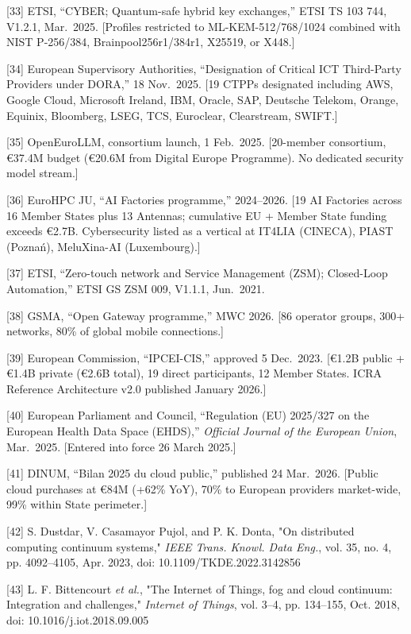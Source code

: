 \documentclass{ieeeaccess}
\begin{document}
{[}33{]} ETSI, ``CYBER; Quantum-safe hybrid key exchanges,'' ETSI TS 103
744, V1.2.1, Mar.~2025. {[}Profiles restricted to ML-KEM-512/768/1024
combined with NIST P-256/384, Brainpool256r1/384r1, X25519, or X448.{]}

{[}34{]} European Supervisory Authorities, ``Designation of Critical ICT
Third-Party Providers under DORA,'' 18 Nov.~2025. {[}19 CTPPs designated
including AWS, Google Cloud, Microsoft Ireland, IBM, Oracle, SAP,
Deutsche Telekom, Orange, Equinix, Bloomberg, LSEG, TCS, Euroclear,
Clearstream, SWIFT.{]}

{[}35{]} OpenEuroLLM, consortium launch, 1 Feb.~2025. {[}20-member
consortium, €37.4M budget (€20.6M from Digital Europe Programme). No
dedicated security model stream.{]}

{[}36{]} EuroHPC JU, ``AI Factories programme,'' 2024--2026. {[}19 AI
Factories across 16 Member States plus 13 Antennas; cumulative EU +
Member State funding exceeds €2.7B. Cybersecurity listed as a vertical
at IT4LIA (CINECA), PIAST (Poznań), MeluXina-AI (Luxembourg).{]}

{[}37{]} ETSI, ``Zero-touch network and Service Management (ZSM);
Closed-Loop Automation,'' ETSI GS ZSM 009, V1.1.1, Jun.~2021.

{[}38{]} GSMA, ``Open Gateway programme,'' MWC 2026. {[}86 operator
groups, 300+ networks, 80\% of global mobile connections.{]}

{[}39{]} European Commission, ``IPCEI-CIS,'' approved 5 Dec.~2023.
{[}€1.2B public + €1.4B private (€2.6B total), 19 direct participants,
12 Member States. ICRA Reference Architecture v2.0 published January
2026.{]}

{[}40{]} European Parliament and Council, ``Regulation (EU) 2025/327 on
the European Health Data Space (EHDS),'' \emph{Official Journal of the
European Union}, Mar.~2025. {[}Entered into force 26 March 2025.{]}

{[}41{]} DINUM, ``Bilan 2025 du cloud public,'' published 24 Mar.~2026.
{[}Public cloud purchases at €84M (+62\% YoY), 70\% to European
providers market-wide, 99\% within State perimeter.{]}

{[}42{]} S. Dustdar, V. Casamayor Pujol, and P. K. Donta, "On
distributed computing continuum systems," \emph{IEEE Trans. Knowl. Data
Eng.}, vol. 35, no. 4, pp. 4092--4105, Apr. 2023, doi:
10.1109/TKDE.2022.3142856

{[}43{]} L. F. Bittencourt \emph{et al.}, "The Internet of Things, fog
and cloud continuum: Integration and challenges," \emph{Internet of
Things}, vol. 3--4, pp. 134--155, Oct. 2018, doi:
10.1016/j.iot.2018.09.005
\end{document}

